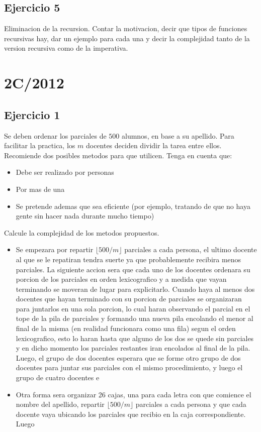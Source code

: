 \documentclass[10pt, a4paper]{article}
\begin{document}
\subsection*{Ejercicio 5}
Eliminacion de la recursion. Contar la motivacion, decir que tipos de funciones recursivas hay, dar un ejemplo para cada una y decir la complejidad tanto de la version recursiva como de la imperativa.

\newpage
\section{2C/2012}

\subsection*{Ejercicio 1}

Se deben ordenar los parciales de $500$ alumnos, en base a su apellido. Para facilitar la practica, los $m$ docentes deciden dividir la tarea entre ellos. Recomiende dos posibles metodos para que utilicen. Tenga en cuenta que:
\begin{itemize}
 \item Debe ser realizado por personas
 \item Por mas de una
 \item Se pretende ademas que sea eficiente (por ejemplo, tratando de que no haya gente sin hacer nada durante mucho tiempo)
\end{itemize}

Calcule la complejidad de los metodos propuestos.

\begin{itemize}
 \item Se empezara por repartir $\lfloor500/m\rfloor$ parciales a cada persona, el ultimo docente al que se le repatiran tendra suerte ya que probablemente recibira menos parciales. La siguiente accion sera que cada uno de los docentes ordenara su porcion de los parciales en orden lexicografico y a medida que vayan terminando se moveran de lugar para explicitarlo. Cuando haya al menos dos docentes que hayan terminado con su porcion de parciales se organizaran para juntarlos en una sola porcion, lo cual haran observando el parcial en el tope de la pila de parciales y formando una nueva pila encolando el menor al final de la misma (en realidad funcionara como una fila) segun el orden lexicografico, esto lo haran hasta que alguno de los dos se quede sin parciales y en dicho momento los parciales restantes iran encolados al final de la pila. Luego, el grupo de dos docentes esperara que se forme otro grupo de dos docentes para juntar sus parciales con el mismo procedimiento, y luego el grupo de cuatro docentes e
 
 \item Otra forma sera organizar 26 cajas, una para cada letra con que comience el nombre del apellido, repartir $\lfloor500/m\rfloor$ parciales a cada persona y que cada docente vaya ubicando los parciales que recibio en la caja correspondiente. Luego
\end{itemize}
\end{document}
